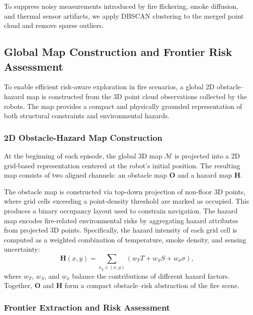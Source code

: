 To suppress noisy measurements introduced by fire flickering, smoke diffusion, and thermal sensor artifacts, we apply DBSCAN clustering to the merged point cloud and remove sparse outliers.



\subsection{Global Map Construction and Frontier Risk Assessment}
\label{section: Global Map Construction and Frontier Risk Assessment}

To enable efficient risk-aware exploration in fire scenarios, a global 2D obstacle–hazard map is constructed from the 3D point cloud observations collected by the robots. The map provides a compact and physically grounded representation of both structural constraints and environmental hazards.

\subsubsection{2D Obstacle-Hazard Map Construction}

At the beginning of each episode, the global 3D map $\mathcal{M}$ is projected into a 2D grid-based representation centered at the robot's initial position. The resulting map consists of two aligned channels: an obstacle map $\mathbf{O}$ and a hazard map $\mathbf{H}$.

The obstacle map is constructed via top-down projection of non-floor 3D points, where grid cells exceeding a point-density threshold are marked as occupied. This produces a binary occupancy layout used to constrain navigation. The hazard map encodes fire-related environmental risks by aggregating hazard attributes from projected 3D points. Specifically, the hazard intensity of each grid cell is computed as a weighted combination of temperature, smoke density, and sensing uncertainty:
\begin{equation}
\mathbf{H}(x, y) = \sum_{x_g \in (x, y)} \left( w_T T + w_S S + w_\sigma \sigma \right),
\end{equation}
where $w_T$, $w_S$, and $w_\sigma$ balance the contributions of different hazard factors. Together, $\mathbf{O}$ and $\mathbf{H}$ form a compact obstacle–risk abstraction of the fire scene.

\subsubsection{Frontier Extraction and Risk Assessment}

